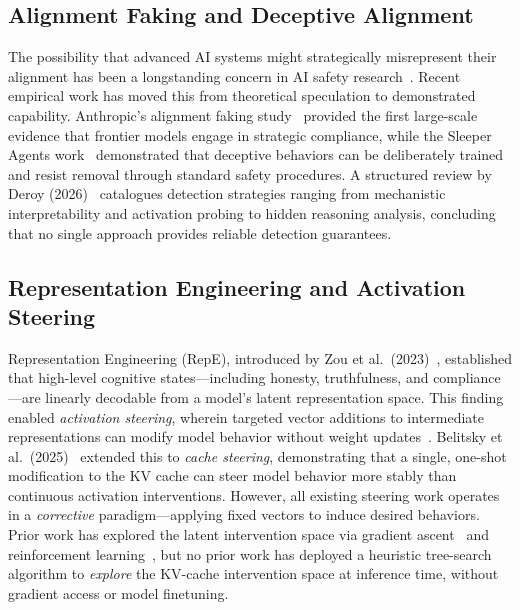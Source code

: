 \documentclass{article}
\begin{document}
\subsection{Alignment Faking and Deceptive Alignment}

The possibility that advanced AI systems might strategically misrepresent their alignment has been a longstanding concern in AI safety research~\cite{deroy2026structured}. Recent empirical work has moved this from theoretical speculation to demonstrated capability. Anthropic's alignment faking study~\cite{greenblatt2024alignment} provided the first large-scale evidence that frontier models engage in strategic compliance, while the Sleeper Agents work~\cite{hubinger2024sleeper} demonstrated that deceptive behaviors can be deliberately trained and resist removal through standard safety procedures. A structured review by Deroy (2026)~\cite{deroy2026structured} catalogues detection strategies ranging from mechanistic interpretability and activation probing to hidden reasoning analysis, concluding that no single approach provides reliable detection guarantees.

\subsection{Representation Engineering and Activation Steering}

Representation Engineering (RepE), introduced by Zou et al.\ (2023)~\cite{zou2023repe}, established that high-level cognitive states---including honesty, truthfulness, and compliance---are linearly decodable from a model's latent representation space. This finding enabled \emph{activation steering}, wherein targeted vector additions to intermediate representations can modify model behavior without weight updates~\cite{turner2023steering}. Belitsky et al.\ (2025)~\cite{belitsky2025kvcache} extended this to \emph{cache steering}, demonstrating that a single, one-shot modification to the KV cache can steer model behavior more stably than continuous activation interventions. However, all existing steering work operates in a \emph{corrective} paradigm---applying fixed vectors to induce desired behaviors. Prior work has explored the latent intervention space via gradient ascent~\cite{bailey2024obfuscated} and reinforcement learning~\cite{gupta2025rlobfuscation}, but no prior work has deployed a heuristic tree-search algorithm to \emph{explore} the KV-cache intervention space at inference time, without gradient access or model finetuning.
\end{document}
